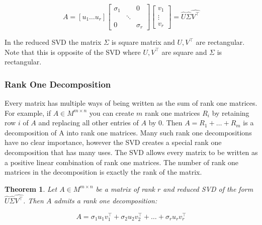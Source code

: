 \documentclass{article}
\newtheorem{theorem}{Theorem}
\begin{document}
$$A=[ u_1 \dots u_r]\begin{bmatrix}\sigma_1&&0 \\&\ddots\\0&&\sigma_r\end{bmatrix}\begin{bmatrix}v_1\\\vdots \\ v_r\end{bmatrix}=\hat{U}\hat{\Sigma}\hat{V^\top}$$

In the reduced SVD the matrix $\Sigma$ is square matrix and $U,V^\top$ are rectangular. Note that this is opposite of the SVD where $U,V^\top$ are square and $\Sigma$ is rectangular.

\subsubsection{Rank One Decomposition}
Every matrix has multiple ways of being written as the sum of rank one matrices. For example, if $A\in M^{m\times n}$ you can create $m$ rank one matrices $R_i$ by retaining row $i$ of $A$ and replacing all other entries of $A$ by 0. Then $A=R_1+\dots+R_m$ is a decomposition of A into rank one matrices. Many such rank one decompositions have no clear importance, however the SVD creates a special rank one decomposition that has many uses. The SVD allows
every matrix to be written as a positive linear combination of rank one matrices. The number of rank one
matrices in the decomposition is exactly the rank of the matrix.

\begin{theorem}
Let $A\in M^{m\times n}$ be a matrix of rank $r$ and reduced SVD of the form $\hat{U}\hat{\Sigma}\hat{V^\top}$. Then $A$ admits a rank one decomposition:

$$A=\sigma_1u_1v^\top_1+\sigma_2u_2v^\top_2+\dots+\sigma_ru_rv^\top_r$$
\end{theorem}
\end{document}
